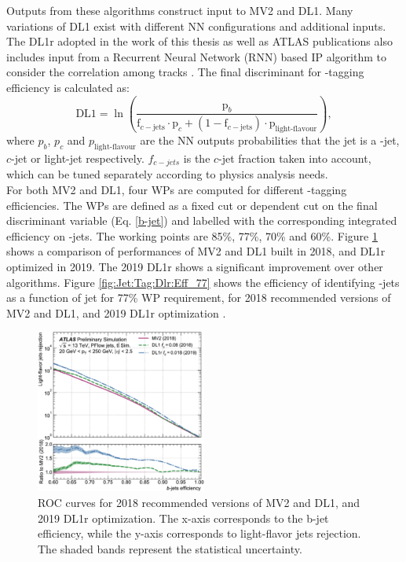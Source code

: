 Outputs from these algorithms construct input to MV2 and DL1. Many variations of DL1 exist with different NN configurations and additional inputs. The DL1r adopted in the work of this thesis as well as ATLAS publications also includes input from a Recurrent Neural Network (RNN) based IP algorithm to consider the correlation among tracks \cite{DL1r}. The final discriminant for \bq-tagging efficiency is calculated as:
\begin{equation}
    \mathrm{DL} 1=\ln \left(\frac{\mathrm{p}_{b}}{\mathrm{f}_{c-\mathrm{jets}} \cdot \mathrm{p}_{c}+\left(1-\mathrm{f}_{c-\mathrm{jets}}\right) \cdot \mathrm{p}_{\text{light-flavour}}}\right),
    \label{b-jet}
\end{equation}
where $p_b$, $p_c$ and $p_{\text{light-flavour}}$ are the NN outputs probabilities that the jet is a \bq-jet, $c$-jet or light-jet respectively. $f_{c-jets}$ is the $c$-jet fraction taken into account, which can be tuned separately according to physics analysis needs. \\  
For both MV2 and DL1, four WPs are computed for different \bq-tagging efficiencies. The WPs are defined as a fixed cut or \pT dependent cut on the final discriminant variable (Eq. \ref{b-jet}) and labelled with the corresponding integrated efficiency on \bq-jets. The working points are 85\%, 77\%, 70\% and 60\%. Figure \ref{fig:Jet:Tag:Dlr:Eff} shows a comparison of performances of MV2 and DL1 built in 2018, and DL1r optimized in 2019. The 2019 DL1r shows a significant improvement over other algorithms. Figure \ref{fig:Jet:Tag:Dlr:Eff_77} shows the efficiency of identifying \bq-jets as a function of jet \pT for 77\% WP requirement, for 2018 recommended versions of MV2 and DL1, and 2019 DL1r optimization \cite{Btag_Perf}. 
\begin{figure}[htbp]
    \centering
    \includegraphics[width=0.5\textwidth]{Ch4/Img/b_jet_Eff.png}
    \caption{ROC curves for 2018 recommended versions of MV2 and DL1, and 2019 DL1r optimization. The x-axis corresponds to the b-jet efficiency, while the y-axis corresponds to light-flavor jets rejection. The shaded bands represent the statistical uncertainty.}
    \label{fig:Jet:Tag:Dlr:Eff}
\end{figure}
